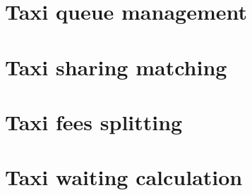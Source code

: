 \section{Taxi queue management}

\section{Taxi sharing matching}

\section{Taxi fees splitting}

\section{Taxi waiting calculation}
